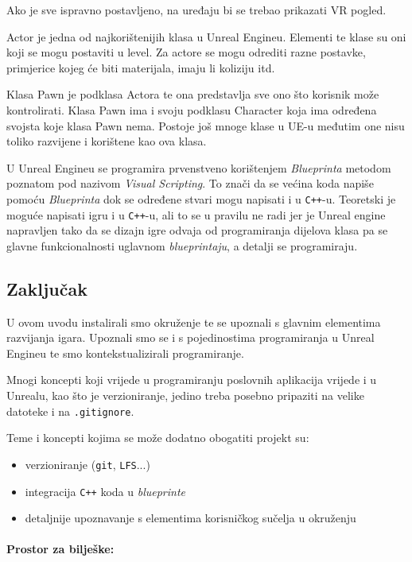 \documentclass[a4paper,10pt]{article}
\begin{document}
Ako je sve ispravno postavljeno, na uređaju bi se trebao prikazati VR pogled.



Actor je jedna od najkorištenijih klasa u Unreal Engineu. Elementi te klase su
oni koji se mogu postaviti u level. Za actore se mogu odrediti razne postavke,
primjerice kojeg će biti materijala, imaju li koliziju itd.

Klasa Pawn je podklasa Actora te ona predstavlja sve ono što korisnik može
kontrolirati. Klasa Pawn ima i svoju podklasu Character koja ima određena
svojsta koje klasa Pawn nema. Postoje još mnoge klase u UE-u međutim one nisu
toliko razvijene i korištene kao ova klasa.


U Unreal Engineu se programira prvenstveno korištenjem \textit{Blueprinta} metodom poznatom pod nazivom
\textit{Visual Scripting}. To znači da se većina koda napiše pomoću
\textit{Blueprinta} dok se
određene stvari mogu napisati i u \texttt{C++}-u. Teoretski je moguće napisati igru i u
\texttt{C++}-u, ali to se u pravilu ne radi jer je Unreal engine napravljen
tako da se dizajn igre odvaja od programiranja dijelova klasa pa se glavne
funkcionalnosti uglavnom \textit{blueprintaju}, a detalji se programiraju.

\subsection{Zaključak}

U ovom uvodu instalirali smo okruženje te se upoznali s glavnim elementima
razvijanja igara. Upoznali smo se i s pojedinostima programiranja u Unreal
Engineu te smo kontekstualizirali programiranje.

Mnogi koncepti koji vrijede u programiranju poslovnih aplikacija vrijede i u
Unrealu, kao što je verzioniranje, jedino treba posebno pripaziti na velike
datoteke i na \texttt{.gitignore}. 

Teme i koncepti kojima se može dodatno obogatiti projekt su:
\begin{itemize}
	\item verzioniranje (\texttt{git}, \texttt{LFS}...)
	\item integracija \texttt{C++} koda u \textit{blueprinte}
	\item detaljnije upoznavanje s elementima korisničkog sučelja u
		okruženju
\end{itemize}

\paragraph{Prostor za bilješke:}\phantom{}
\end{document}
